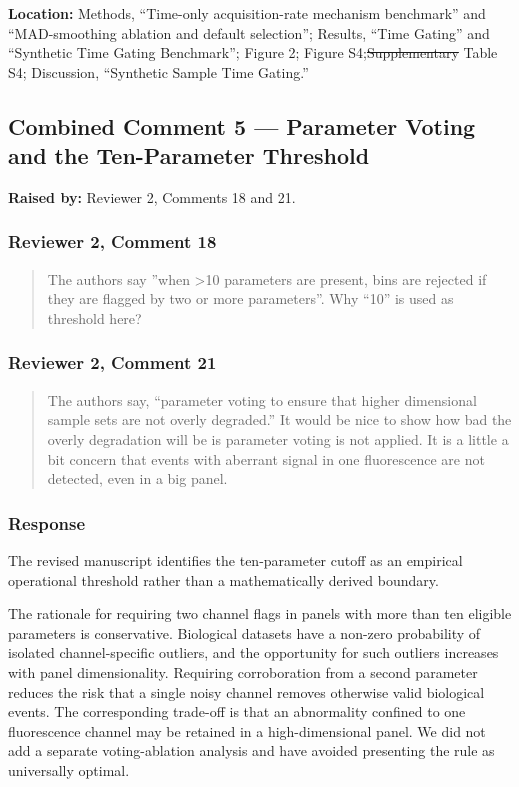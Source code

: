 \documentclass[
  11pt,
  a4paper,
]{article}
\begin{document}
\textbf{Location:} Methods, ``Time-only acquisition-rate mechanism
benchmark'' and ``MAD-smoothing ablation and default selection'';
Results, ``Time Gating'' and ``Synthetic Time Gating Benchmark''; Figure
2; Figure S4;{\color{revisionred}\sout{Supplementary}} Table S4;
Discussion, ``Synthetic Sample Time Gating.''

\subsection{Combined Comment 5 --- Parameter Voting and the
Ten-Parameter
Threshold}\label{combined-comment-5--parameter-voting-and-the-ten-parameter-threshold}

\textbf{Raised by:} Reviewer 2, Comments 18 and 21.

\subsubsection{Reviewer 2, Comment 18}\label{reviewer-2-comment-18}

\begin{quote}
The authors say ''when \textgreater10 parameters are present, bins are
rejected if they are flagged by two or more parameters''. Why ``10'' is
used as threshold here?
\end{quote}

\subsubsection{Reviewer 2, Comment 21}\label{reviewer-2-comment-21}

\begin{quote}
The authors say, ``parameter voting to ensure that higher dimensional
sample sets are not overly degraded.'' It would be nice to show how bad
the overly degradation will be is parameter voting is not applied. It is
a little a bit concern that events with aberrant signal in one
fluorescence are not detected, even in a big panel.
\end{quote}

\subsubsection{Response}\label{response-4}

The revised manuscript identifies the ten-parameter cutoff as an
empirical operational threshold rather than a mathematically derived
boundary.

The rationale for requiring two channel flags in panels with more than
ten eligible parameters is conservative. Biological datasets have a
non-zero probability of isolated channel-specific outliers, and the
opportunity for such outliers increases with panel dimensionality.
Requiring corroboration from a second parameter reduces the risk that a
single noisy channel removes otherwise valid biological events. The
corresponding trade-off is that an abnormality confined to one
fluorescence channel may be retained in a high-dimensional panel. We did
not add a separate voting-ablation analysis and have avoided presenting
the rule as universally optimal.
\end{document}
